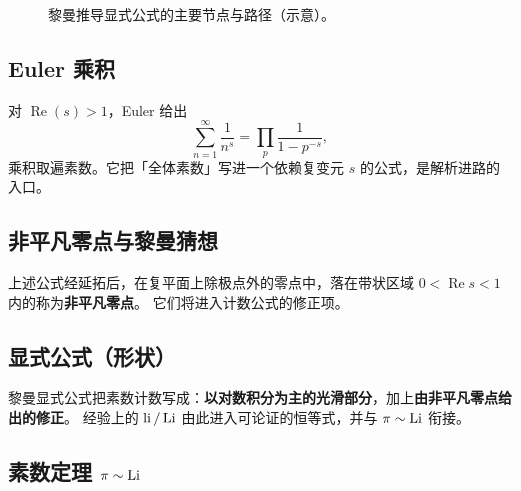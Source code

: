 \begin{figure}[htbp]
\centering
{}
\caption{黎曼推导显式公式的主要节点与路径（示意）。}
\label{fig:zeta_zeros_primes}
\end{figure}

\subsection{Euler 乘积}
\label{subsec:euler_product_complex}

对 $\operatorname{Re}(s)>1$，Euler 给出
\begin{equation}
  \sum_{n=1}^{\infty}\frac{1}{n^{s}}
  =\prod_{p}\frac{1}{1-p^{-s}},
  \label{thm:euler-product-ch1}
\end{equation}
乘积取遍素数。它把「全体素数」写进一个依赖复变元 $s$ 的公式，是解析进路的入口。

\subsection{非平凡零点与黎曼猜想}
\label{subsec:zeros_rh_intro}

上述公式经延拓后，在复平面上除极点外的零点中，落在带状区域 $0<\operatorname{Re}s<1$ 内的称为\textbf{非平凡零点}。
它们将进入计数公式的修正项。

\subsection{显式公式（形状）}
\label{subsec:explicit_formula_intro}

黎曼显式公式把素数计数写成：\textbf{以对数积分为主的光滑部分}，加上\textbf{由非平凡零点给出的修正}。
经验上的 $\operatorname{li}/\operatorname{Li}$ 由此进入可论证的恒等式，并与 $\pi\sim\operatorname{Li}$ 衔接。

\subsection{素数定理 \texorpdfstring{$\pi\sim\operatorname{Li}$}{pi ~ Li}}
\label{subsec:pnt_as_endpoint}

